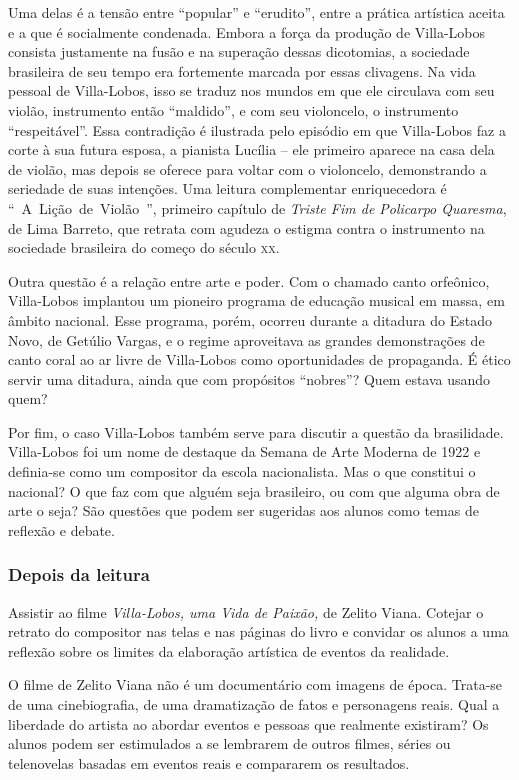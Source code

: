 \documentclass[11pt]{extarticle}
\begin{document}
Uma delas é a tensão entre ``popular'' e ``erudito'', entre a prática
artística aceita e a que é socialmente condenada. Embora a força da
produção de Villa-Lobos consista justamente na fusão e na superação
dessas dicotomias, a sociedade brasileira de seu tempo era fortemente
marcada por essas clivagens. Na vida pessoal de Villa-Lobos, isso se
traduz nos mundos em que ele circulava com seu violão, instrumento então
``maldido'', e com seu violoncelo, o instrumento ``respeitável''. Essa
contradição é ilustrada pelo episódio em que Villa-Lobos faz a corte à
sua futura esposa, a pianista Lucília -- ele primeiro aparece na casa
dela de violão, mas depois se oferece para voltar com o violoncelo,
demonstrando a seriedade de suas intenções. Uma leitura complementar
enriquecedora é ``~A~Lição~de~Violão~'', primeiro capítulo de
\emph{Triste Fim de Policarpo Quaresma}, de Lima Barreto, que retrata
com agudeza o estigma contra o instrumento na sociedade brasileira do
começo do século \textsc{xx}.

Outra questão é a relação entre arte e poder. Com o chamado canto
orfeônico, Villa-Lobos implantou um pioneiro programa de educação
musical em massa, em âmbito nacional. Esse programa, porém, ocorreu
durante a ditadura do Estado Novo, de Getúlio Vargas, e o regime
aproveitava as grandes demonstrações de canto coral ao ar livre de
Villa-Lobos como oportunidades de propaganda. É ético servir uma
ditadura, ainda que com propósitos ``nobres''? Quem estava usando quem?

Por fim, o caso Villa-Lobos também serve para discutir a questão da
brasilidade. Villa-Lobos foi um nome de destaque da Semana de Arte
Moderna de 1922 e definia-se como um compositor da escola nacionalista.
Mas o que constitui o nacional? O que faz com que alguém seja
brasileiro, ou com que alguma obra de arte o seja? São questões que
podem ser sugeridas aos alunos como temas de reflexão e debate.

\subsubsection{Depois da leitura}

Assistir ao filme \emph{Villa-Lobos, uma Vida de Paixão,} de Zelito
Viana. Cotejar o retrato do compositor nas telas e nas páginas do livro 
e convidar os alunos a uma reflexão sobre os limites da elaboração
artística de eventos da realidade.

O filme de Zelito Viana não é um documentário com imagens de época.
Trata-se de uma cinebiografia, de uma dramatização de fatos e
personagens reais. Qual a liberdade do artista ao abordar eventos e
pessoas que realmente existiram? Os alunos podem ser estimulados a se
lembrarem de outros filmes, séries ou telenovelas basadas em eventos
reais e compararem os resultados.
\end{document}
